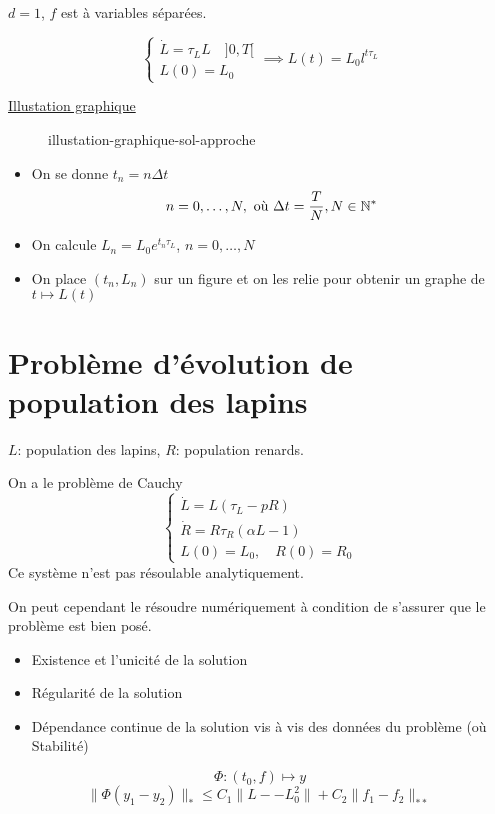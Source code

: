 $d=1$,  $f$ est à variables séparées.
 \begin{eg}
     \[
     \begin{cases}
         \dot{L} = \tau_L L \quad ]0, T[\\
         L(0) = L_0
     \end{cases} \implies L(t) = L_0 l^{t \tau_L}
     \] 
\end{eg}
\underline{Illustation graphique}
\begin{figure}[H]
    \centering
    \caption{illustation-graphique-sol-approche}
    \label{fig:illustation-graphique-sol-approche}
\end{figure}
\begin{itemize}
    \item On se donne $t_n = n \Delta t$
         \[
        n = 0, \ldots, N, \text{ où } \Delta t = \frac{T}{N}, N \in \mathbb{N}^*
        \] 
    \item On calcule $L_n = L_0 e^{t_n \tau_L}$, $n = 0, \ldots, N$
    \item On place $(t_n, L_n)$ sur un figure et on les relie pour obtenir un graphe de  $t \mapsto L(t)$
\end{itemize}

\section{Problème d'évolution de population des lapins}
$L$: population des lapins,  $R$: population renards.

On a le problème de Cauchy
 \[
\begin{cases}
    \dot{L} = L(\tau_L - p R)\\
    \dot{R} = R\tau_R (\alpha L - 1)\\
    L(0) = L_0, \quad R(0) = R_0
\end{cases}
\] 
Ce système n'est pas résoulable analytiquement.

On peut cependant le résoudre numériquement à condition de s'assurer que le problème est bien posé.
\begin{itemize}
    \item Existence et l'unicité de la solution
    \item Régularité de la solution
    \item Dépendance continue de la solution vis à vis des données du problème (où Stabilité)
\end{itemize}
\[
\Phi: (t_0, f) \mapsto y
\] 
\[
    \|\Phi(y_1 - y_2)\|_{*} \le C_1\|L- - L_0^2\| + C_2\|f_1 - f_2\|_{**}
\] 

